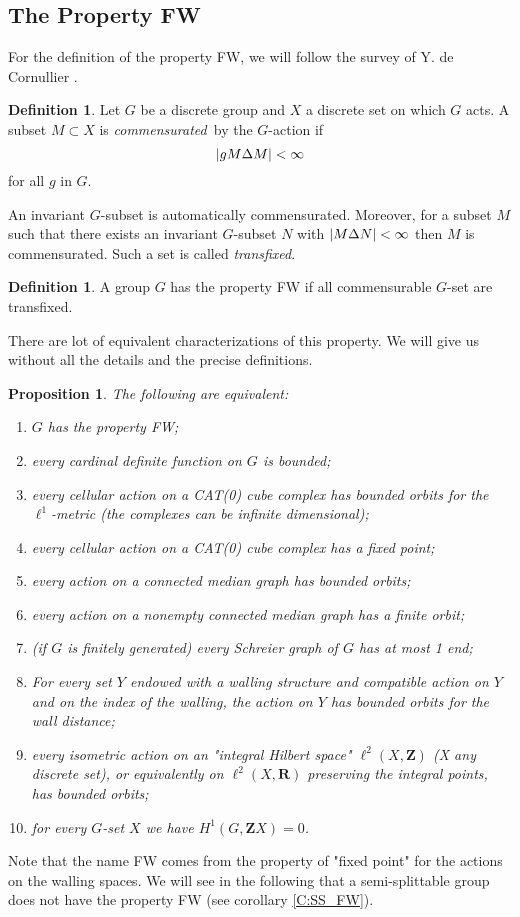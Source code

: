 \documentclass[a4paper]{article}
\makeatletter
\renewcommand{\todo}[2][]{\tikzexternaldisable\@todo[#1]{#2}\tikzexternalenable}
\newtheorem{prop}[lem]{Proposition}
\theoremstyle{definition}
\newtheorem{defn}[lem]{Definition}
\theoremstyle{remark}%
\DeclarePairedDelimiter\abs{\lvert}{\rvert}
\newcommand*{\field}[1]{\mathbf{#1}}
\newcommand*{\Z}{\field{Z}}
\newcommand*{\R}{\field{R}}
\makeatother
\begin{document}
\subsection{The Property FW}
%
For the definition of the property FW, we will follow the survey of Y. de Cornullier \cite{Cornulier2013}.
%
\begin{defn}
Let $G$ be a discrete group and $X$ a discrete set on which $G$ acts. A subset $M \subset X$ is \emph{commensurated} by the $G$-action if 
\[
\abs{gM \Delta M} < \infty 
\]
for all $g$ in $G$.
\end{defn}
An invariant $G$-subset is automatically  commensurated. Moreover, for a subset $M$ such that there exists an invariant $G$-subset $N$ with $\abs{M \Delta N}< \infty$ then $M$ is commensurated. 
Such a set is called \emph{transfixed}.
%
%
\begin{defn}
A group $G$ has the property FW if all commensurable $G$-set are transfixed.
\end{defn}
There are lot of equivalent characterizations of this property. We will give us without all the details and the precise definitions.
%
%
\begin{prop}\label{P:charact_FW}
The following are equivalent:
\begin{enumerate}
\item\label{C:FW_def} $G$ has the property FW;
\item every cardinal definite function on $G$ is bounded;
\item\label{C:FW_Cat(0)} every cellular action on a CAT(0) cube complex has bounded orbits for the $\ell^1$-metric (the complexes can be infinite dimensional);
\item every cellular action on a CAT(0) cube complex has a fixed point;
\item \label{C_FW_MedianGRaph}every action on a connected median graph has bounded orbits;
\item every action on a nonempty connected median graph has a finite orbit;
\item \label{C:FW_Schrei} (if $G$ is finitely generated) every Schreier graph of $G$ has at most 1 end;
\item \label{C:FW_Wallings}For every set $Y$ endowed with a walling structure and compatible action on $Y$ and on the index of the walling, the action on $Y$ has bounded orbits for the wall distance;
\item \label{C:FW_Hilbert} every isometric action on an "integral Hilbert space" $\ell^2(X,\Z)$ (X any discrete set), or equivalently on $\ell^2(X,\R)$ preserving the integral points, has bounded orbits;
\item for every $G$-set $X$ we have $H^1(G,\Z X)=0$.
\end{enumerate}
\end{prop}
Note that the name FW comes from the property of "fixed point" for the actions on the walling spaces. We will see in the following that a semi-splittable group does not have the property FW (see corollary \ref{C:SS_FW}).
%
\end{document}
